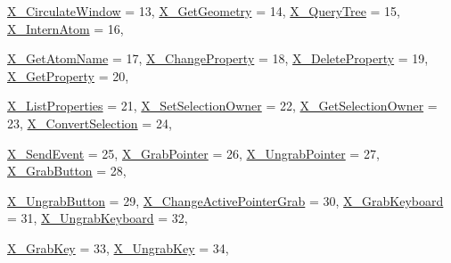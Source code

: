 \begin{DoxyCompactItemize}
\par
\hyperlink{namespace_tao_1_1_platform_1_1_x11_a2cfd0ff14439adb84809be96fb4c7d4b}{X\_\-CirculateWindow} =  13, 
\hyperlink{namespace_tao_1_1_platform_1_1_x11_a2cfd0ff14439adb84809be96fb4c7d4b}{X\_\-GetGeometry} =  14, 
\hyperlink{namespace_tao_1_1_platform_1_1_x11_a2cfd0ff14439adb84809be96fb4c7d4b}{X\_\-QueryTree} =  15, 
\hyperlink{namespace_tao_1_1_platform_1_1_x11_a2cfd0ff14439adb84809be96fb4c7d4b}{X\_\-InternAtom} =  16, 
\par
\hyperlink{namespace_tao_1_1_platform_1_1_x11_a2cfd0ff14439adb84809be96fb4c7d4b}{X\_\-GetAtomName} =  17, 
\hyperlink{namespace_tao_1_1_platform_1_1_x11_a2cfd0ff14439adb84809be96fb4c7d4b}{X\_\-ChangeProperty} =  18, 
\hyperlink{namespace_tao_1_1_platform_1_1_x11_a2cfd0ff14439adb84809be96fb4c7d4b}{X\_\-DeleteProperty} =  19, 
\hyperlink{namespace_tao_1_1_platform_1_1_x11_a2cfd0ff14439adb84809be96fb4c7d4b}{X\_\-GetProperty} =  20, 
\par
\hyperlink{namespace_tao_1_1_platform_1_1_x11_a2cfd0ff14439adb84809be96fb4c7d4b}{X\_\-ListProperties} =  21, 
\hyperlink{namespace_tao_1_1_platform_1_1_x11_a2cfd0ff14439adb84809be96fb4c7d4b}{X\_\-SetSelectionOwner} =  22, 
\hyperlink{namespace_tao_1_1_platform_1_1_x11_a2cfd0ff14439adb84809be96fb4c7d4b}{X\_\-GetSelectionOwner} =  23, 
\hyperlink{namespace_tao_1_1_platform_1_1_x11_a2cfd0ff14439adb84809be96fb4c7d4b}{X\_\-ConvertSelection} =  24, 
\par
\hyperlink{namespace_tao_1_1_platform_1_1_x11_a2cfd0ff14439adb84809be96fb4c7d4b}{X\_\-SendEvent} =  25, 
\hyperlink{namespace_tao_1_1_platform_1_1_x11_a2cfd0ff14439adb84809be96fb4c7d4b}{X\_\-GrabPointer} =  26, 
\hyperlink{namespace_tao_1_1_platform_1_1_x11_a2cfd0ff14439adb84809be96fb4c7d4b}{X\_\-UngrabPointer} =  27, 
\hyperlink{namespace_tao_1_1_platform_1_1_x11_a2cfd0ff14439adb84809be96fb4c7d4b}{X\_\-GrabButton} =  28, 
\par
\hyperlink{namespace_tao_1_1_platform_1_1_x11_a2cfd0ff14439adb84809be96fb4c7d4b}{X\_\-UngrabButton} =  29, 
\hyperlink{namespace_tao_1_1_platform_1_1_x11_a2cfd0ff14439adb84809be96fb4c7d4b}{X\_\-ChangeActivePointerGrab} =  30, 
\hyperlink{namespace_tao_1_1_platform_1_1_x11_a2cfd0ff14439adb84809be96fb4c7d4b}{X\_\-GrabKeyboard} =  31, 
\hyperlink{namespace_tao_1_1_platform_1_1_x11_a2cfd0ff14439adb84809be96fb4c7d4b}{X\_\-UngrabKeyboard} =  32, 
\par
\hyperlink{namespace_tao_1_1_platform_1_1_x11_a2cfd0ff14439adb84809be96fb4c7d4b}{X\_\-GrabKey} =  33, 
\hyperlink{namespace_tao_1_1_platform_1_1_x11_a2cfd0ff14439adb84809be96fb4c7d4b}{X\_\-UngrabKey} =  34, 

\end{DoxyCompactItemize}
